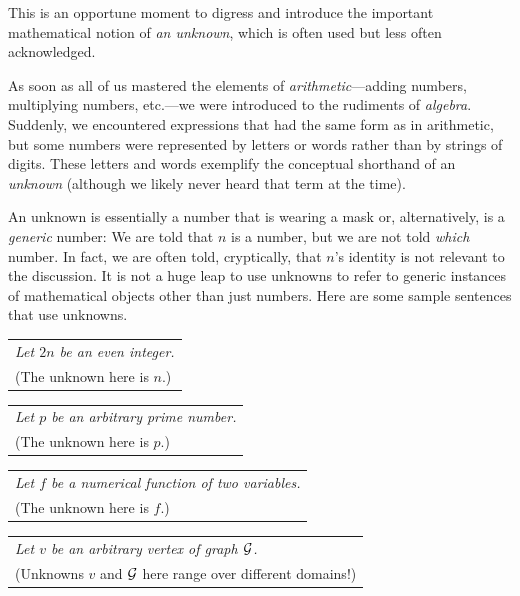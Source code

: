 This is an opportune moment to digress and introduce the important mathematical notion of {\it an unknown}, which is often used but less often acknowledged.

\smallskip

As soon as all of us mastered the elements of {\it arithmetic}---adding numbers, multiplying numbers, etc.---we were introduced to the rudiments of {\it algebra}.  Suddenly, we encountered expressions that had the same form as in arithmetic, but some numbers were represented by letters or words rather than by strings of digits.  These letters and words exemplify the conceptual shorthand of an {\it unknown} (although we likely never heard that term at the time).  

\smallskip

An unknown is essentially a number that is wearing a mask or, alternatively, is a {\em generic} number:  We are told that $n$ is a number, but we are not told {\em which} number.  In fact, we are often told, cryptically, that $n$'s identity is not relevant to the discussion.  It is not a huge leap to use unknowns to refer to generic instances of mathematical objects other than just numbers.  Here are some sample sentences that use unknowns.

\medskip

\hspace*{.1in}\begin{tabular}{l}
{\em Let $2n$ be an even integer.} \\
(The unknown here is $n$.)
\end{tabular}

\smallskip

\hspace*{.1in}\begin{tabular}{l}
{\em Let $p$ be an arbitrary prime number.} \\
(The unknown here is $p$.)
\end{tabular}

\smallskip

\hspace*{.1in}\begin{tabular}{l}
{\em Let $f$ be a numerical function of two variables.} \\
(The unknown here is $f$.)
\end{tabular}

\smallskip

\hspace*{.1in}\begin{tabular}{l}
{\em Let $v$ be an arbitrary vertex of graph $\mbox{$\cal G$}$.} \\
(Unknowns $v$ and $\mbox{$\cal G$}$ here range over different domains!)  \\
 \end{tabular}

